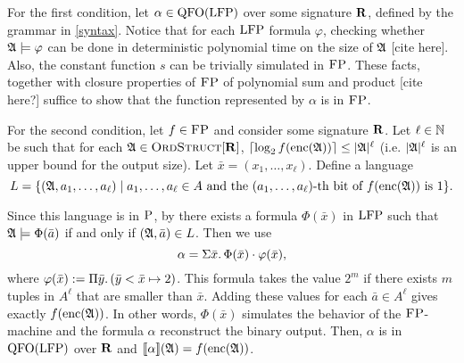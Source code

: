 For the first condition, let $\alpha\in{\rm QFO}({\rm LFP})$ over some signature $\mathbf{R}$, defined by the grammar in \ref{syntax}. Notice that for each ${\rm LFP}$ formula $\varphi$,  checking whether $\mathfrak{A}\models\varphi$ can be done in deterministic polynomial time on the size of $\mathfrak{A}$ [cite here]. Also, the constant function $s$ can be trivially simulated in $\text{\sc FP}$. These facts, together with closure properties of $\text{\sc FP}$ of polynomial sum and product [cite here?] suffice to show that the function represented by $\alpha$ is in $\text{\sc FP}$.
	
For the second condition, let $f\in \text{\sc FP}$ and consider some signature $\mathbf{R}$.
Let $\ell\in\mathbb{N}$ be such that for each $\mathfrak{A}\in\text{\sc OrdStruct}[\mathbf{R}]$, $\lceil\log_2 f({\rm enc}(\mathfrak{A})) \rceil \leq \vert \mathfrak{A} \vert^\ell$ (i.e. $\vert \mathfrak{A} \vert^\ell$ is an upper bound for the output size).
Let $\bar{x} = (x_1,\ldots,x_{\ell})$.
Define a language
\[
L = \{(\mathfrak{A},a_1,\ldots,a_{\ell})\mid a_1,\ldots,a_{\ell}\in A \text{ and the } (a_1,\ldots,a_{\ell})\text{-th bit of }f({\rm enc}(\mathfrak{A}))\text{ is 1}\}.
\]

Since this language is in $\text{\sc P}$, by \cite{I86} there exists a formula $\Phi(\bar{x})$ in ${\rm LFP}$ such that $\mathfrak{A}\models\Phi(\bar{a})$ if and only if $(\mathfrak{A},\bar{a})\in L$. 
Then we use
$$
\alpha = \Sigma{\bar{x}}.\, \Phi(\bar{x})\cdot\varphi(\bar{x}),
$$
where $\varphi(\bar{x}) := \Pi{\bar{y}}.\,(\bar{y} < \bar{x} \mapsto 2)$. This formula takes the value $2^m$ if there exists $m$ tuples in $A^{\ell}$ that are smaller than $\bar{x}$. Adding these values for each $\bar{a}\in A^{\ell}$ gives exactly $f({\rm enc}(\mathfrak{A}))$. 
In other words, $\Phi(\bar{x})$ simulates the behavior of the $\text{\sc FP}$-machine and the formula $\alpha$ reconstruct the binary output.
Then, $\alpha$ is in ${\rm QFO}({\rm LFP})$ over $\mathbf{R}$ and ${\llbracket{}{\alpha}\rrbracket}(\mathfrak{A}) = f({\rm enc}(\mathfrak{A}))$.